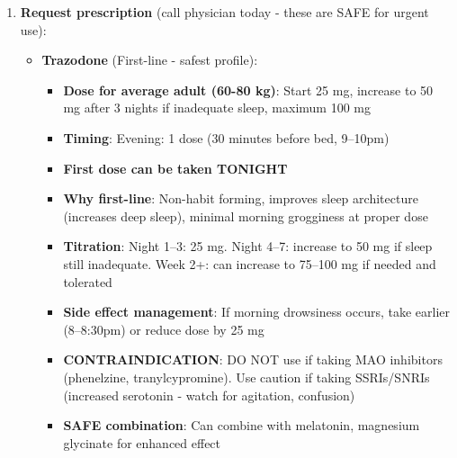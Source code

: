 \begin{enumerate}
    \item \textbf{Request prescription} (call physician today - these are SAFE for urgent use):
    \begin{itemize}
        \item \textbf{Trazodone} (First-line - safest profile):
        \begin{itemize}
            \item \textbf{Dose for average adult (60-80 kg)}: Start 25 mg, increase to 50 mg after 3 nights if inadequate sleep, maximum 100 mg
            \item \textbf{Timing}: Evening: 1 dose (30 minutes before bed, 9--10pm)
            \item \textbf{First dose can be taken TONIGHT}
            \item \textbf{Why first-line}: Non-habit forming, improves sleep architecture (increases deep sleep), minimal morning grogginess at proper dose
            \item \textbf{Titration}: Night 1--3: 25 mg. Night 4--7: increase to 50 mg if sleep still inadequate. Week 2+: can increase to 75--100 mg if needed and tolerated
            \item \textbf{Side effect management}: If morning drowsiness occurs, take earlier (8--8:30pm) or reduce dose by 25 mg
            \item \textbf{CONTRAINDICATION}: DO NOT use if taking MAO inhibitors (phenelzine, tranylcypromine). Use caution if taking SSRIs/SNRIs (increased serotonin - watch for agitation, confusion)
            \item \textbf{SAFE combination}: Can combine with melatonin, magnesium glycinate for enhanced effect
        \end{itemize}


\end{itemize}
\end{enumerate}
